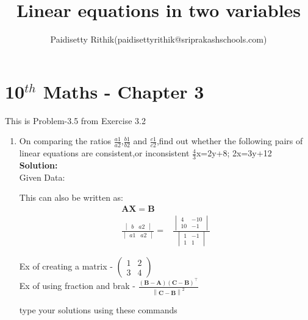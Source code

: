 \documentclass[12pt]{article}
\title{Linear equations in two variables}
\author{Paidisetty Rithik(paidisettyrithik@sriprakashschools.com)}
\newcommand{\myvec}[1]{\ensuremath{\begin{pmatrix}#1\end{pmatrix}}}
\newcommand{\mydet}[1]{\ensuremath{\begin{vmatrix}#1\end{vmatrix}}}
\newcommand{\solution}{\noindent \textbf{Solution: }}
\providecommand{\brak}[1]{\ensuremath{\left(#1\right)}}
\providecommand{\norm}[1]{\left\lVert#1\right\rVert}
\let\vec\mathbf
\begin{document}
\maketitle
\section*{10$^{th}$ Maths - Chapter 3}
This is Problem-3.5 from Exercise 3.2
\begin{enumerate}
\item On comparing the ratios $\frac{a1}{a2}$,$\frac{b1}{b2}$ and $\frac{c1}{c2}$,find out whether the following pairs of linear equations are consistent,or inconsistent
$\frac{4}{3}$x=2y+8;
2x=3y+12 \\
\solution \\
Given Data:

This can also be written as:
\begin{align}
\vec{AX}=\vec{B} \\
\frac{\mydet{ b & a2}}{\mydet{ a1 & a2}} =&
\frac{\mydet{ 4 & -10 \\ 10 & -1}}{\mydet{1&-1\\1&1}}
\end{align}

Ex of creating a matrix - $\myvec{1&2\\3&4}$\\
Ex of using fraction and brak - $\frac{\brak{\vec{B}-\vec{A}}\brak{\vec{C}-\vec{B}}^{\top}}{\norm{\vec{C-B}}^2}$

type your solutions using these commands
	

\end{enumerate}
\end{document}
